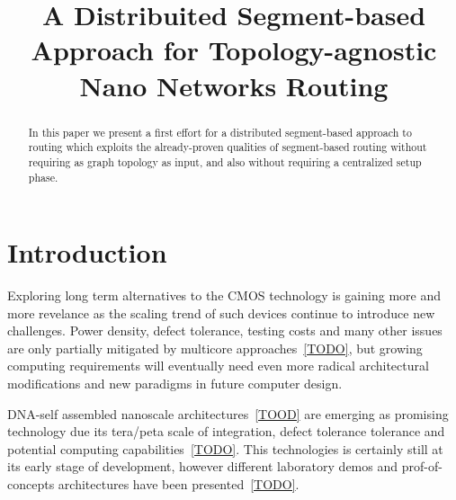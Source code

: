 \documentclass[conference]{IEEEtran}
\begin{document}

\title{A Distribuited Segment-based Approach for Topology-agnostic Nano Networks Routing} 

\author{
    \and
    }

\maketitle


\begin{abstract}
In this paper we present a first effort for a distributed
segment-based approach to routing which exploits the already-proven
qualities of segment-based routing without requiring as graph
topology as input, and also without requiring a centralized setup
phase.
\end{abstract}




\section{Introduction}
Exploring long term alternatives to the CMOS technology is gaining
more and more revelance as the scaling trend of such devices continue
to introduce new challenges. Power density, defect tolerance, testing
costs and many other issues are only partially mitigated by multicore
approaches~\ref{TODO}, but growing computing requirements will eventually need
even more radical architectural modifications and new paradigms in
future computer design.

DNA-self assembled nanoscale architectures~\ref{TOOD} are emerging as promising
technology due its tera/peta scale of integration, defect tolerance
tolerance and potential computing capabilities~\ref{TODO}. This
technologies is certainly still at its early stage of development,
however different laboratory demos and prof-of-concepts architectures
have been presented~\ref{TODO}.
\end{document}
